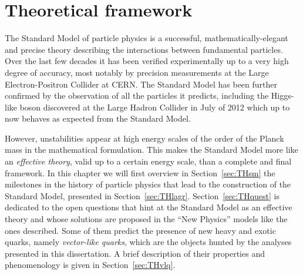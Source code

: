 \clearpage{\pagestyle{empty}\cleardoublepage}

\chapter{Theoretical framework}\label{chap:TH}

\vspace{-2.5cm}



\vspace{0.5cm}

The Standard Model of particle physics is a
successful, mathematically-elegant and precise 
theory describing the interactions
between fundamental particles. 
Over the last few decades it has been verified experimentally
up to a very high degree of accuracy, most notably by precision measurements 
at the Large Electron-Positron Collider at CERN.
The Standard Model has been further confirmed 
by the observation of all the particles it 
predicts, including the Higgs-like boson discovered at the
Large Hadron Collider in July of 2012 which up to now 
behaves as expected from the Standard Model.

However, unstabilities appear at high energy scales 
of the order of the Planck mass in the mathematical formulation.
This makes the Standard Model more like an {\it effective theory}, 
valid up to a certain energy scale, than a complete and final framework.
In this chapter we will first overview in Section~\ref{sec:THsm} the milestones
in the history of particle physics that lead to the construction
of the Standard Model, presented in Section~\ref{sec:THlagr}.
Section~\ref{sec:THquest} is dedicated to the
open questions that hint at the Standard Model 
as an effective theory and whose solutions are proposed
in the ``New Physics'' models like the ones described.
Some of them predict the presence of new heavy and exotic
quarks, namely {\it vector-like quarks}, which are
the objects hunted by the analyses presented in this dissertation.
A brief description of their properties and phenomenology is
given in Section~\ref{sec:THvlq}.







